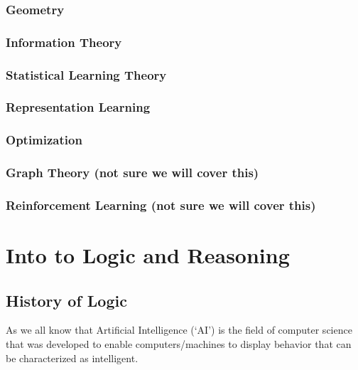 \documentclass[]{book}
\theoremstyle{definition}
\theoremstyle{definition}
\theoremstyle{definition}
\theoremstyle{remark}
\begin{document}
\subsection{Geometry}\label{geometry}

\subsection{Information Theory}\label{information-theory-1}

\subsection{Statistical Learning
Theory}\label{statistical-learning-theory}

\subsection{Representation Learning}\label{representation-learning}

\subsection{Optimization}\label{optimization}

\subsection{Graph Theory (not sure we will cover
this)}\label{graph-theory-not-sure-we-will-cover-this}

\subsection{Reinforcement Learning (not sure we will cover
this)}\label{reinforcement-learning-not-sure-we-will-cover-this}

\chapter{Into to Logic and Reasoning}\label{into-to-logic-and-reasoning}

\section{History of Logic}\label{history-of-logic}

As we all know that Artificial Intelligence (`AI') is the field of
computer science that was developed to enable computers/machines to
display behavior that can be characterized as intelligent.
\end{document}
